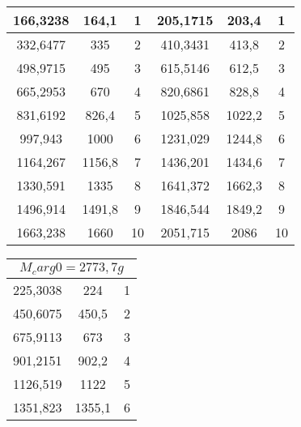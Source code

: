 \documentclass[a4paper, 12pt]{article}%
\begin{document}
\begin{enumerate}
\begin{center}
\begin{tabular}{|c|c|c|ccc}
166,3238        & 164,1          & 1         & \multicolumn{1}{c|}{205,1715} & \multicolumn{1}{c|}{203,4}    & \multicolumn{1}{c|}{1}     \\ \hline
332,6477        & 335            & 2         & \multicolumn{1}{c|}{410,3431} & \multicolumn{1}{c|}{413,8}    & \multicolumn{1}{c|}{2}     \\ \hline
498,9715        & 495            & 3         & \multicolumn{1}{c|}{615,5146} & \multicolumn{1}{c|}{612,5}    & \multicolumn{1}{c|}{3}     \\ \hline
665,2953        & 670            & 4         & \multicolumn{1}{c|}{820,6861} & \multicolumn{1}{c|}{828,8}    & \multicolumn{1}{c|}{4}     \\ \hline
831,6192        & 826,4          & 5         & \multicolumn{1}{c|}{1025,858} & \multicolumn{1}{c|}{1022,2}   & \multicolumn{1}{c|}{5}     \\ \hline
997,943         & 1000           & 6         & \multicolumn{1}{c|}{1231,029} & \multicolumn{1}{c|}{1244,8}   & \multicolumn{1}{c|}{6}     \\ \hline
1164,267        & 1156,8         & 7         & \multicolumn{1}{c|}{1436,201} & \multicolumn{1}{c|}{1434,6}   & \multicolumn{1}{c|}{7}     \\ \hline
1330,591        & 1335           & 8         & \multicolumn{1}{c|}{1641,372} & \multicolumn{1}{c|}{1662,3}   & \multicolumn{1}{c|}{8}     \\ \hline
1496,914        & 1491,8         & 9         & \multicolumn{1}{c|}{1846,544} & \multicolumn{1}{c|}{1849,2}   & \multicolumn{1}{c|}{9}     \\ \hline
1663,238        & 1660           & 10        & \multicolumn{1}{c|}{2051,715} & \multicolumn{1}{c|}{2086}     & \multicolumn{1}{c|}{10}    \\ \hline
\end{tabular}
\begin{tabular}{|c|c|c|}
\hline
\multicolumn{3}{|c|}{$M_carg0  =  2773,7 g$} \\ \hline
225,3038         & 224           & 1         \\ \hline
450,6075         & 450,5         & 2         \\ \hline
675,9113         & 673           & 3         \\ \hline
901,2151         & 902,2         & 4         \\ \hline
1126,519         & 1122          & 5         \\ \hline
1351,823         & 1355,1        & 6         \\ \hline

\end{tabular}
\end{center}
\end{enumerate}
\end{document}
